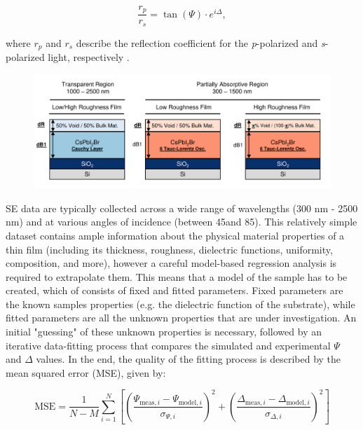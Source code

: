\begin{equation}
\frac{r_p}{r_s} = \tan(\Psi) \cdot e^{i\Delta},
\label{eq:ellipsometry}
\end{equation}

where $r_p$ and $r_s$ describe the reflection coefficient for the \textit{p}-polarized and \textit{s}-polarized light, respectively \cite{Fujiwara2018SpectroscopicCharacterization}.

\begin{figure}{}
  \centering
  \medskip
  \includegraphics[width=.95\textwidth]{chapters/ellipsometry/image/Model_Approach.pdf}
  \caption{}
  \label{fig:ellipsometry:static_models}
\end{figure}

SE data are typically collected across a wide range of wavelengths (300 nm - 2500 nm) and at various angles of incidence (between 45\degree and 85\degree). This relatively simple dataset contains ample information about the physical material properties of a thin film (including its thickness, roughness, dielectric functions, uniformity, composition, and more), however a careful model-based regression analysis is required to extrapolate them. This means that a model of the sample has to be created, which of consists of fixed and fitted parameters. Fixed parameters are the known samples properties (e.g. the dielectric function of the substrate), while fitted parameters are all the unknown properties that are under investigation. An initial "guessing" of these unknown properties is necessary, followed by an iterative data-fitting process that compares the simulated and experimental $\Psi$ and $\Delta$ values. In the end, the quality of the fitting process is described by the mean squared error (MSE), given by: 




\begin{equation}
\text{MSE} = \frac{1}{N - M} \sum_{i=1}^{N} \left[ \left( \frac{\Psi_{\text{meas},i} - \Psi_{\text{model},i}}{\sigma_{\Psi,i}} \right)^2 + \left( \frac{\Delta_{\text{meas},i} - \Delta_{\text{model},i}}{\sigma_{\Delta,i}} \right)^2 \right]
\label{eq:mse}
\end{equation}


